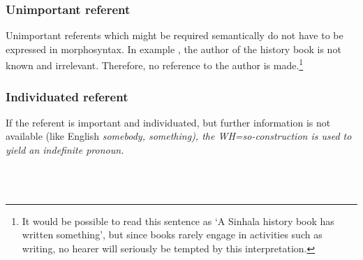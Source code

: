 \subsubsection{Unimportant referent}\label{sec:func:Unimportantreferent}


Unimportant referents which might be required semantically do not have to be expressed in morphosyntax.
In example , the author of the history book is not known and irrelevant. Therefore, no reference to the author is made.\footnote{It would be possible to read this sentence as `A Sinhala history book has written something', but since books rarely engage in activities such as writing, no hearer will seriously be tempted by this interpretation.}




\subsubsection{Individuated referent}\label{sec:func:Individuatedreferent}
If the referent is important and  individuated, but further information is not available (like English \em somebody, something\em), the WH=\em so\em-construction is used to yield an indefinite pronoun.

 \\
\\

%
%
%


